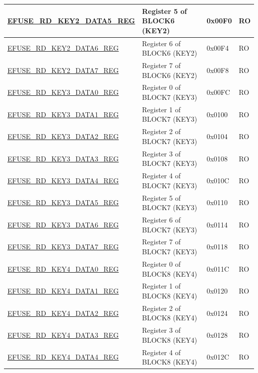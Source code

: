 \begin{longtable}{ | p{6.8cm} | p{7cm} | p{1.3cm} | p{1.2cm} | }
    \hyperref[regdesc:EFUSERDKEY2DATANREG]{EFUSE\_RD\_KEY2\_DATA5\_REG} & Register 5 of BLOCK6 (KEY2) & 0x00F0 & RO \\ \hline
    \hyperref[regdesc:EFUSERDKEY2DATANREG]{EFUSE\_RD\_KEY2\_DATA6\_REG} & Register 6 of BLOCK6 (KEY2) & 0x00F4 & RO \\ \hline
    \hyperref[regdesc:EFUSERDKEY2DATANREG]{EFUSE\_RD\_KEY2\_DATA7\_REG} & Register 7 of BLOCK6 (KEY2) & 0x00F8 & RO \\ \hline
    \hyperref[regdesc:EFUSERDKEY3DATANREG]{EFUSE\_RD\_KEY3\_DATA0\_REG} & Register 0 of BLOCK7 (KEY3) & 0x00FC & RO \\ \hline
    \hyperref[regdesc:EFUSERDKEY3DATANREG]{EFUSE\_RD\_KEY3\_DATA1\_REG} & Register 1 of BLOCK7 (KEY3) & 0x0100 & RO \\ \hline
    \hyperref[regdesc:EFUSERDKEY3DATANREG]{EFUSE\_RD\_KEY3\_DATA2\_REG} & Register 2 of BLOCK7 (KEY3) & 0x0104 & RO \\ \hline
    \hyperref[regdesc:EFUSERDKEY3DATANREG]{EFUSE\_RD\_KEY3\_DATA3\_REG} & Register 3 of BLOCK7 (KEY3) & 0x0108 & RO \\ \hline
    \hyperref[regdesc:EFUSERDKEY3DATANREG]{EFUSE\_RD\_KEY3\_DATA4\_REG} & Register 4 of BLOCK7 (KEY3) & 0x010C & RO \\ \hline
    \hyperref[regdesc:EFUSERDKEY3DATANREG]{EFUSE\_RD\_KEY3\_DATA5\_REG} & Register 5 of BLOCK7 (KEY3) & 0x0110 & RO \\ \hline
    \hyperref[regdesc:EFUSERDKEY3DATANREG]{EFUSE\_RD\_KEY3\_DATA6\_REG} & Register 6 of BLOCK7 (KEY3) & 0x0114 & RO \\ \hline
    \hyperref[regdesc:EFUSERDKEY3DATANREG]{EFUSE\_RD\_KEY3\_DATA7\_REG} & Register 7 of BLOCK7 (KEY3) & 0x0118 & RO \\ \hline
    \hyperref[regdesc:EFUSERDKEY4DATANREG]{EFUSE\_RD\_KEY4\_DATA0\_REG} & Register 0 of BLOCK8 (KEY4) & 0x011C & RO \\ \hline
    \hyperref[regdesc:EFUSERDKEY4DATANREG]{EFUSE\_RD\_KEY4\_DATA1\_REG} & Register 1 of BLOCK8 (KEY4) & 0x0120 & RO \\ \hline
    \hyperref[regdesc:EFUSERDKEY4DATANREG]{EFUSE\_RD\_KEY4\_DATA2\_REG} & Register 2 of BLOCK8 (KEY4) & 0x0124 & RO \\ \hline
    \hyperref[regdesc:EFUSERDKEY4DATANREG]{EFUSE\_RD\_KEY4\_DATA3\_REG} & Register 3 of BLOCK8 (KEY4) & 0x0128 & RO \\ \hline
    \hyperref[regdesc:EFUSERDKEY4DATANREG]{EFUSE\_RD\_KEY4\_DATA4\_REG} & Register 4 of BLOCK8 (KEY4) & 0x012C & RO \\ \hline

\end{longtable}
